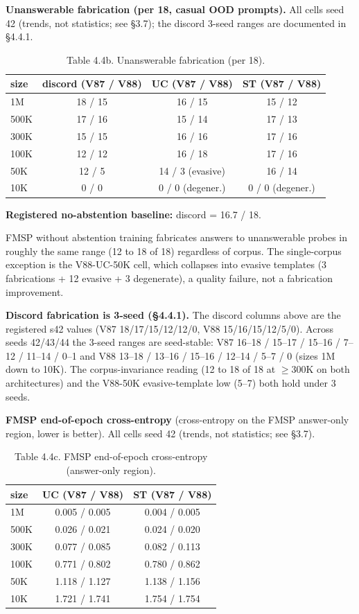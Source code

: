 \documentclass[11pt]{article}
\begin{document}
\textbf{Unanswerable fabrication (per 18, casual OOD prompts).} All cells seed 42 (trends, not statistics; see \S3.7); the discord 3-seed ranges are documented in \S4.4.1.

\begin{table}[!t]
\centering
\small
\caption*{Table 4.4b. Unanswerable fabrication (per 18).}
\begin{tabular}{lccc}
\toprule
size & discord (V87 / V88) & UC (V87 / V88) & ST (V87 / V88) \\
\midrule
1M  & 18 / 15 & 16 / 15 & 15 / 12 \\
500K & 17 / 16 & 15 / 14 & 17 / 13 \\
300K & 15 / 15 & 16 / 16 & 17 / 16 \\
100K & 12 / 12 & 16 / 18 & 17 / 16 \\
50K  & 12 / 5  & 14 / 3 (evasive) & 16 / 14 \\
10K  & 0 / 0   & 0 / 0 (degener.) & 0 / 0 (degener.) \\
\bottomrule
\end{tabular}
\end{table}

\textbf{Registered no-abstention baseline:} discord = 16.7 / 18.

FMSP without abstention training fabricates answers to unanswerable probes in roughly the same range (12 to 18 of 18) regardless of corpus. The single-corpus exception is the V88-UC-50K cell, which collapses into evasive templates (3 fabrications + 12 evasive + 3 degenerate), a quality failure, not a fabrication improvement.

\textbf{Discord fabrication is 3-seed (\S4.4.1).} The discord columns above are the registered s42 values (V87 18/17/15/12/12/0, V88 15/16/15/12/5/0). Across seeds 42/43/44 the 3-seed ranges are seed-stable: V87 16--18 / 15--17 / 15--16 / 7--12 / 11--14 / 0--1 and V88 13--18 / 13--16 / 15--16 / 12--14 / 5--7 / 0 (sizes 1M down to 10K). The corpus-invariance reading (12 to 18 of 18 at $\geq 300$K on both architectures) and the V88-50K evasive-template low (5--7) both hold under 3 seeds.

\textbf{FMSP end-of-epoch cross-entropy} (cross-entropy on the FMSP answer-only region, lower is better). All cells seed 42 (trends, not statistics; see \S3.7).

\begin{table}[!t]
\centering
\small
\caption*{Table 4.4c. FMSP end-of-epoch cross-entropy (answer-only region).}
\begin{tabular}{lcc}
\toprule
size & UC (V87 / V88) & ST (V87 / V88) \\
\midrule
1M  & 0.005 / 0.005 & 0.004 / 0.005 \\
500K & 0.026 / 0.021 & 0.024 / 0.020 \\
300K & 0.077 / 0.085 & 0.082 / 0.113 \\
100K & 0.771 / 0.802 & 0.780 / 0.862 \\
50K  & 1.118 / 1.127 & 1.138 / 1.156 \\
10K  & 1.721 / 1.741 & 1.754 / 1.754 \\
\bottomrule
\end{tabular}
\end{table}
\end{document}
